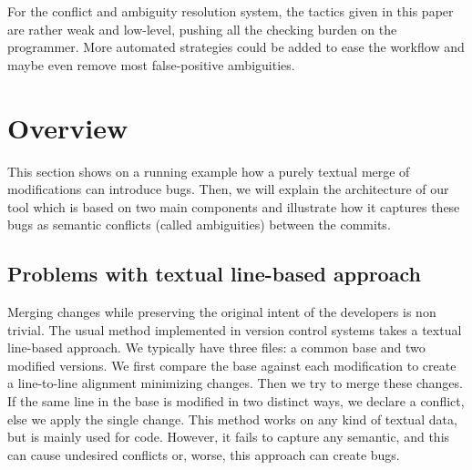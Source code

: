 \documentclass[a4paper,11pt]{article}
\begin{document}
For the conflict and ambiguity resolution system, the tactics given in
this paper are rather weak and low-level, pushing all the checking
burden on the programmer. More automated strategies could be added to
ease the workflow and maybe even remove most false-positive
ambiguities.

\section{Overview}
\label{sec:overview}

This section shows on a running example how a purely textual merge of
modifications can introduce bugs. Then, we will explain the
architecture of our tool which is based on two main components and
illustrate how it captures these bugs as semantic conflicts (called
ambiguities) between the commits.

\subsection{Problems with textual line-based approach}
Merging changes while preserving the original intent of the
developers is non trivial. The usual method implemented in version
control systems takes a textual line-based approach. We typically have
three files: a common base and two modified versions. We first compare
the base against each modification to create a line-to-line alignment
minimizing changes. Then we try to merge these changes. If the same
line in the base is modified in two distinct ways, we declare a
conflict, else we apply the single change. This method works on any
kind of textual data, but is mainly used for code. However, it fails
to capture any semantic, and this can cause undesired conflicts or,
worse, this approach can create bugs.
\end{document}
